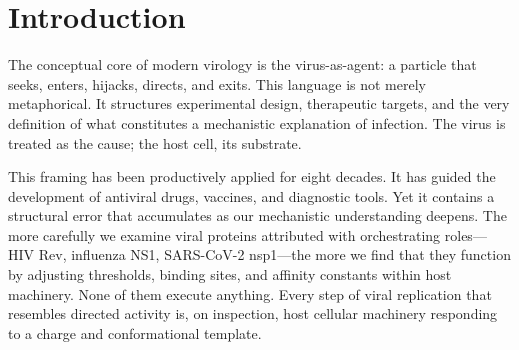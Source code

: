 \documentclass[11pt,twocolumn,a4paper]{article}
\theoremstyle{definition}
\theoremstyle{remark}
\begin{document}
\begin{abstract}
From these three frameworks we derive, without additional assumptions, the following: (i) viral nucleic acids must present charge-oscillation profiles matching the host's constitutively expressed housekeeping genes, because those are the templates the host machinery is calibrated to process; (ii) viral proteins are categorical boundary conditions that shift partition thresholds in host infrastructure, not orchestrators; (iii) infection probability is the overlap integral between the viral charge template and the host cell's current oscillatory exploration trajectory; (iv) viral genome size scales with host cell volume through an inversion of the cellular C-value conservation law; and (v) the observed failure of bacteriophages to infect human cells at shared mucosal surfaces reflects zero overlap between bacterial and human categorical spaces, not receptor specificity alone. Each claim generates specific, testable predictions. The framework implies that antiviral strategy should target host categorical state rather than viral machinery.
\end{abstract}

\newpage
\tableofcontents
\newpage

\section{Introduction}
\label{sec:introduction}

The conceptual core of modern virology is the virus-as-agent: a particle that seeks, enters, hijacks, directs, and exits. This language is not merely metaphorical. It structures experimental design, therapeutic targets, and the very definition of what constitutes a mechanistic explanation of infection. The virus is treated as the cause; the host cell, its substrate.

This framing has been productively applied for eight decades. It has guided the development of antiviral drugs, vaccines, and diagnostic tools. Yet it contains a structural error that accumulates as our mechanistic understanding deepens. The more carefully we examine viral proteins attributed with orchestrating roles---HIV Rev, influenza NS1, SARS-CoV-2 nsp1---the more we find that they function by adjusting thresholds, binding sites, and affinity constants within host machinery. None of them execute anything. Every step of viral replication that resembles directed activity is, on inspection, host cellular machinery responding to a charge and conformational template.
\end{document}
